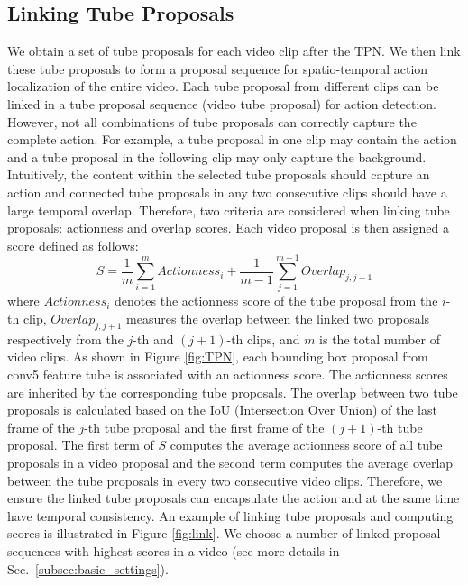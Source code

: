 \documentclass[10pt,twocolumn,letterpaper]{article}
\begin{document}
\subsection{Linking Tube Proposals}
\label{subsec: link}


We obtain  a set of tube proposals for each video clip after the TPN. We then link these tube proposals to form a proposal sequence for spatio-temporal action localization of the entire video.
Each tube proposal from different clips can be linked in a tube proposal sequence (\ie video tube proposal) for action detection. However, not all combinations of tube proposals can correctly capture the complete action. For example, a tube proposal in one clip may contain the action and a tube proposal in the following clip may only capture the background.  Intuitively, the content within the selected tube proposals should capture an action and connected tube proposals in any two consecutive clips should have a large temporal overlap. Therefore, two criteria are considered when linking tube proposals: actionness and overlap scores. Each video proposal is then assigned a score defined as follows:
\begin{equation}
S=\frac{1}{m}\sum_{i=1}^m Actionness_i+\frac{1}{m-1}\sum_{j=1}^{m-1} Overlap_{j,j+1}
\end{equation}
where $Actionness_i$ denotes the actionness score of the tube proposal from the $i$-th clip, $Overlap_{j,j+1}$ measures the overlap between the linked two proposals respectively from the $j$-th and $(j+1)$-th clips, and $m$ is the total number of video clips. As shown in Figure \ref{fig:TPN}, each bounding box proposal from conv5 feature tube is associated with an actionness score. The actionness scores are inherited by the corresponding tube proposals. The overlap between two tube proposals is calculated based on the IoU (Intersection Over Union) of the last frame of the $j$-th tube proposal and the first frame of the $(j+1)$-th tube proposal. The first term of $S$ computes the average actionness score of all tube proposals in a video proposal and the second term computes the average overlap between the tube proposals in every two consecutive video clips. Therefore, we ensure the linked tube proposals can encapsulate the action and at the same time have temporal consistency. An example of linking tube proposals and computing scores is illustrated in Figure \ref{fig:link}.
We choose a number of linked proposal sequences with highest scores in a video (see more details in Sec.~\ref{subsec:basic_settings}).
\end{document}
